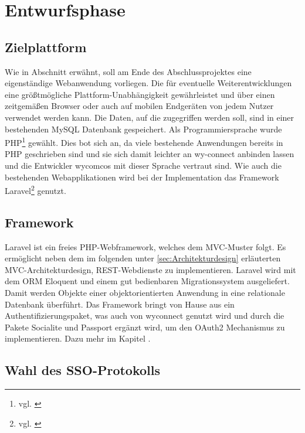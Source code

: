 \section{Entwurfsphase} 
\label{sec:Entwurfsphase}

\subsection{Zielplattform}
\label{sec:Zielplattform}

Wie in Abschnitt  erwähnt, soll am Ende des Abschlussprojektes eine eigenständige Webanwendung vorliegen. Die für eventuelle Weiterentwicklungen eine größtmögliche Plattform-Unabhängigkeit gewährleistet und über einen zeitgemäßen Browser oder auch auf mobilen Endgeräten von jedem Nutzer verwendet werden kann. 
Die Daten, auf die zugegriffen werden soll, sind in einer bestehenden MySQL Datenbank gespeichert. 
Als Programmiersprache wurde \ac{PHP}\footnote{vgl. \cite{PHP}} gewählt. Dies bot sich an, da viele bestehende Anwendungen bereits in PHP geschrieben sind und sie sich damit leichter an wy-connect anbinden lassen und die Entwickler wycomcos mit dieser Sprache vertraut sind. 
Wie auch die bestehenden Webapplikationen wird bei der Implementation das Framework Laravel\footnote{vgl. \cite{Laravel}} genutzt.

\subsection{Framework}
\label{sec:Framework}

Laravel ist ein freies \ac{PHP}-Webframework, welches dem \ac{MVC}-Muster folgt. 
Es ermöglicht neben dem im folgenden unter \ref{sec:Architekturdesign} erläuterten MVC-Architekturdesign, \ac{REST}-Webdienste zu implementieren.
Laravel wird mit dem \ac{ORM} Eloquent und einem gut bedienbaren Migrationssystem ausgeliefert. Damit werden Objekte einer objektorientierten Anwendung in eine relationale Datenbank überführt.
Das Framework bringt von Hause aus ein Authentifizierungspaket, was auch von wyconnect genutzt wird und durch die Pakete Socialite und Passport ergänzt wird, um den OAuth2 Mechanismus zu implementieren. Dazu mehr im Kapitel .

\subsection{Wahl des SSO-Protokolls}
\label{sec:Protokollwahl}

